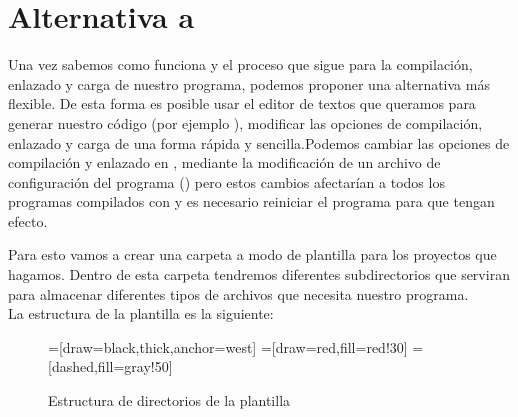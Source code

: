 \newpage

\section{Alternativa a }

Una vez sabemos como funciona  y el proceso que sigue para la compilación, enlazado y carga de nuestro programa, podemos proponer una alternativa más flexible.  
De esta forma es posible usar el editor de textos que queramos para generar nuestro código (por ejemplo ), modificar las opciones de compilación, enlazado y carga de una forma rápida y sencilla.Podemos cambiar las opciones de compilación y enlazado en , mediante la  modificación de un archivo de configuración del programa () pero estos cambios afectarían a todos los programas compilados con  y es necesario reiniciar el programa para que tengan efecto. 

Para esto vamos a crear una carpeta a modo de plantilla para los proyectos que hagamos. Dentro de esta carpeta tendremos diferentes subdirectorios que serviran para almacenar diferentes tipos de archivos que necesita nuestro programa.\\
La estructura de la plantilla es la siguiente:

\begin{figure}[H]
\begin{center}
=[draw=black,thick,anchor=west]
=[draw=red,fill=red!30]
=[dashed,fill=gray!50]
\end{center}
\caption{Estructura de directorios de la plantilla}
\label{plantilla_carpetas}
\end{figure}

